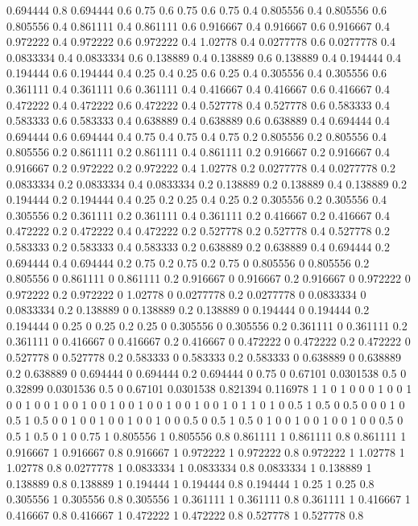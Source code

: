 0.694444 0.8
0.694444 0.6
0.75 0.6
0.75 0.6
0.75 0.4
0.805556 0.4
0.805556 0.6
0.805556 0.4
0.861111 0.4
0.861111 0.6
0.916667 0.4
0.916667 0.6
0.916667 0.4
0.972222 0.4
0.972222 0.6
0.972222 0.4
1.02778 0.4
0.0277778 0.6
0.0277778 0.4
0.0833334 0.4
0.0833334 0.6
0.138889 0.4
0.138889 0.6
0.138889 0.4
0.194444 0.4
0.194444 0.6
0.194444 0.4
0.25 0.4
0.25 0.6
0.25 0.4
0.305556 0.4
0.305556 0.6
0.361111 0.4
0.361111 0.6
0.361111 0.4
0.416667 0.4
0.416667 0.6
0.416667 0.4
0.472222 0.4
0.472222 0.6
0.472222 0.4
0.527778 0.4
0.527778 0.6
0.583333 0.4
0.583333 0.6
0.583333 0.4
0.638889 0.4
0.638889 0.6
0.638889 0.4
0.694444 0.4
0.694444 0.6
0.694444 0.4
0.75 0.4
0.75 0.4
0.75 0.2
0.805556 0.2
0.805556 0.4
0.805556 0.2
0.861111 0.2
0.861111 0.4
0.861111 0.2
0.916667 0.2
0.916667 0.4
0.916667 0.2
0.972222 0.2
0.972222 0.4
1.02778 0.2
0.0277778 0.4
0.0277778 0.2
0.0833334 0.2
0.0833334 0.4
0.0833334 0.2
0.138889 0.2
0.138889 0.4
0.138889 0.2
0.194444 0.2
0.194444 0.4
0.25 0.2
0.25 0.4
0.25 0.2
0.305556 0.2
0.305556 0.4
0.305556 0.2
0.361111 0.2
0.361111 0.4
0.361111 0.2
0.416667 0.2
0.416667 0.4
0.472222 0.2
0.472222 0.4
0.472222 0.2
0.527778 0.2
0.527778 0.4
0.527778 0.2
0.583333 0.2
0.583333 0.4
0.583333 0.2
0.638889 0.2
0.638889 0.4
0.694444 0.2
0.694444 0.4
0.694444 0.2
0.75 0.2
0.75 0.2
0.75 0
0.805556 0
0.805556 0.2
0.805556 0
0.861111 0
0.861111 0.2
0.916667 0
0.916667 0.2
0.916667 0
0.972222 0
0.972222 0.2
0.972222 0
1.02778 0
0.0277778 0.2
0.0277778 0
0.0833334 0
0.0833334 0.2
0.138889 0
0.138889 0.2
0.138889 0
0.194444 0
0.194444 0.2
0.194444 0
0.25 0
0.25 0.2
0.25 0
0.305556 0
0.305556 0.2
0.361111 0
0.361111 0.2
0.361111 0
0.416667 0
0.416667 0.2
0.416667 0
0.472222 0
0.472222 0.2
0.472222 0
0.527778 0
0.527778 0.2
0.583333 0
0.583333 0.2
0.583333 0
0.638889 0
0.638889 0.2
0.638889 0
0.694444 0
0.694444 0.2
0.694444 0
0.75 0
0.67101 0.0301538
0.5 0
0.32899 0.0301536
0.5 0
0.67101 0.0301538
0.821394 0.116978
1 1
0 1
0 0
0 1
0 0
1 0
0 1
0 0
1 0
0 1
0 0
1 0
0 1
0 0
1 0
0 1
0 0
1 0
1 1
0 1
0 0.5
1 0.5
0 0.5
0 0
0 1
0 0.5
1 0.5
0 0
1 0
0 1
0 0
1 0
0 1
0 0
0.5 0
0.5 1
0.5 0
1 0
0 1
0 0
1 0
0 1
0 0
0.5 0
0.5 1
0.5 0
1 0
0.75 1
0.805556 1
0.805556 0.8
0.861111 1
0.861111 0.8
0.861111 1
0.916667 1
0.916667 0.8
0.916667 1
0.972222 1
0.972222 0.8
0.972222 1
1.02778 1
1.02778 0.8
0.0277778 1
0.0833334 1
0.0833334 0.8
0.0833334 1
0.138889 1
0.138889 0.8
0.138889 1
0.194444 1
0.194444 0.8
0.194444 1
0.25 1
0.25 0.8
0.305556 1
0.305556 0.8
0.305556 1
0.361111 1
0.361111 0.8
0.361111 1
0.416667 1
0.416667 0.8
0.416667 1
0.472222 1
0.472222 0.8
0.527778 1
0.527778 0.8
